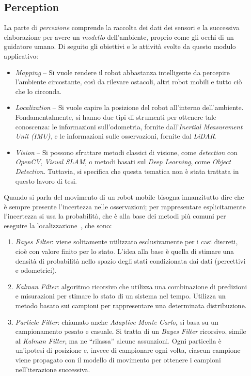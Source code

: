 \subsection{Perception}
La parte di \textit{percezione} comprende la raccolta dei dati dei sensori 
e la successiva elaborazione per avere un \textit{modello} dell'ambiente, proprio
come gli occhi di un guidatore umano.
Di seguito gli obiettivi e le attività svolte da questo modulo applicativo:
\begin{itemize}
    \item \textit{Mapping} -- Si vuole rendere il robot abbastanza intelligente da percepire 
    l’ambiente circostante, così da rilevare ostacoli, altri robot mobili e tutto ciò che lo circonda. 
    \item \textit{Localization} -- Si vuole capire la posizione del robot all’interno
    dell'ambiente. Fondamentalmente, si hanno due tipi di strumenti per ottenere 
    tale conoscenza: le informazioni sull’odometria, fornite dall’\textit{Inertial 
    Measurement Unit (IMU)}, e le informazioni sulle osservazioni,
    fornite dal \textit{LiDAR}.
    \item \textit{Vision} -- Si possono sfruttare metodi classici di visione, come
    \textit{detection} con \textit{OpenCV}, \textit{Visual SLAM}, o metodi basati 
    sul \textit{Deep Learning}, come \textit{Object Detection}. 
    Tuttavia, si specifica che questa tematica non è stata trattata in questo lavoro di tesi.
\end{itemize}
Quando si parla del movimento di un robot mobile bisogna innanzitutto dire che è sempre presente l'incertezza nelle osservazioni; per rappresentare esplicitamente l’incertezza si usa la probabilità, che è alla base dei metodi più comuni per eseguire la localizzazione~\cite{f1tenthcoursel07}, che sono:
\begin{enumerate}
    \item \textit{Bayes Filter}: viene solitamente utilizzato esclusivamente per i casi 
    discreti, cioè con valore finito per lo stato. L’idea alla base è quella di stimare una 
    densità di probabilità nello spazio degli stati condizionata dai dati (percettivi e odometrici).
    \item \textit{Kalman Filter}: algoritmo ricorsivo che utilizza una combinazione di 
    predizioni e misurazioni per stimare lo stato di un sistema nel tempo. Utilizza un metodo 
    basato sui campioni per rappresentare una determinata distribuzione.
    \item \textit{Particle Filter}: chiamato anche \textit{Adaptive Monte Carlo}, si basa su un 
    campionamento pesato e casuale. Si tratta di un \textit{Bayes Filter} ricorsivo,
    simile al \textit{Kalman Filter}, ma ne ``rilassa'' alcune assunzioni. Ogni particella è 
    un’ipotesi di posizione e, invece di campionare ogni volta, ciascun campione viene 
    propagato con il modello di movimento per ottenere i campioni nell’iterazione successiva.
\end{enumerate}

